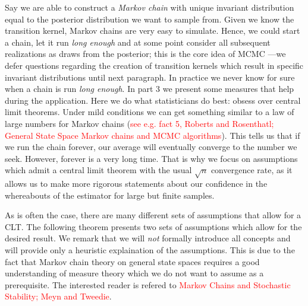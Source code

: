 Say we are able to construct a \emph{Markov chain} with unique invariant distribution equal to the posterior distribution we want to sample from.
Given we know the transition kernel, Markov chains are very easy to simulate.
Hence, we could start a chain, let it run \emph{long enough} and at some point consider all subsequent realizations as draws from the posterior; this is the core idea of MCMC ---we defer questions regarding the creation of transition kernels which result in specific invariant distributions until next paragraph.
In practice we never know for sure when a chain is run \emph{long enough}.
In part 3 we present some measures that help during the application.
Here we do what statisticians do best: obsess over central limit theorems.
Under mild conditions we can get something similar to a law of large numbers for Markov chains (\textcolor{red}{see e.g. fact 5, Roberts and Rosenthatl; General State Space Markov chains and MCMC algorithms}).
This tells us that if we run the chain forever, our average will eventually converge to the number we seek.
However, forever is a very long time.
That is why we focus on assumptions which admit a central limit theorem with the usual $\sqrt{n}$ convergence rate, as it allows us to make more rigorous statements about our confidence in the whereabouts of the estimator for large but finite samples.


\begin{remark}
  As is often the case, there are many different sets of assumptions that allow for a CLT.
  The following theorem presents two sets of assumptions which allow for the desired result.
  We remark that we will \emph{not} formally introduce all concepts and will provide only a heuristic explaination of the assumptions.
  This is due to the fact that Markov chain theory on general state spaces requires a good understanding of measure theory which we do not want to assume as a prerequisite.
  The interested reader is refered to \textcolor{red}{Markov Chains and Stochastic Stability; Meyn and Tweedie}.
\end{remark}


